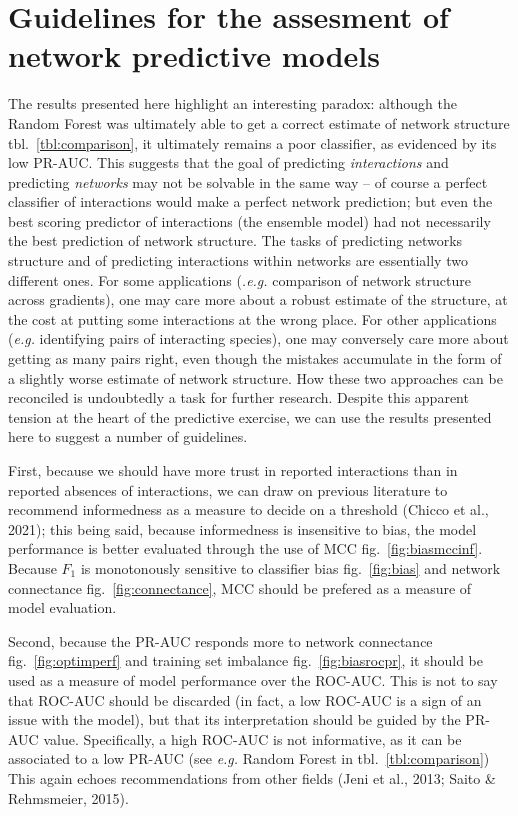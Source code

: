\documentclass[10pt,oneside]{article}
\begin{document}
\hypertarget{guidelines-for-the-assesment-of-network-predictive-models}{%
\section{Guidelines for the assesment of network predictive
models}\label{guidelines-for-the-assesment-of-network-predictive-models}}

The results presented here highlight an interesting paradox: although
the Random Forest was ultimately able to get a correct estimate of
network structure tbl.~\ref{tbl:comparison}, it ultimately remains a
poor classifier, as evidenced by its low PR-AUC. This suggests that the
goal of predicting \emph{interactions} and predicting \emph{networks}
may not be solvable in the same way -- of course a perfect classifier of
interactions would make a perfect network prediction; but even the best
scoring predictor of interactions (the ensemble model) had not
necessarily the best prediction of network structure. The tasks of
predicting networks structure and of predicting interactions within
networks are essentially two different ones. For some applications
(\emph{.e.g.} comparison of network structure across gradients), one may
care more about a robust estimate of the structure, at the cost at
putting some interactions at the wrong place. For other applications
(\emph{e.g.} identifying pairs of interacting species), one may
conversely care more about getting as many pairs right, even though the
mistakes accumulate in the form of a slightly worse estimate of network
structure. How these two approaches can be reconciled is undoubtedly a
task for further research. Despite this apparent tension at the heart of
the predictive exercise, we can use the results presented here to
suggest a number of guidelines.

First, because we should have more trust in reported interactions than
in reported absences of interactions, we can draw on previous literature
to recommend informedness as a measure to decide on a threshold (Chicco
et al., 2021); this being said, because informedness is insensitive to
bias, the model performance is better evaluated through the use of MCC
fig.~\ref{fig:biasmccinf}. Because \(F_1\) is monotonously sensitive to
classifier bias fig.~\ref{fig:bias} and network connectance
fig.~\ref{fig:connectance}, MCC should be prefered as a measure of model
evaluation.

Second, because the PR-AUC responds more to network connectance
fig.~\ref{fig:optimperf} and training set imbalance
fig.~\ref{fig:biasrocpr}, it should be used as a measure of model
performance over the ROC-AUC. This is not to say that ROC-AUC should be
discarded (in fact, a low ROC-AUC is a sign of an issue with the model),
but that its interpretation should be guided by the PR-AUC value.
Specifically, a high ROC-AUC is not informative, as it can be associated
to a low PR-AUC (see \emph{e.g.} Random Forest in
tbl.~\ref{tbl:comparison}) This again echoes recommendations from other
fields (Jeni et al., 2013; Saito \& Rehmsmeier, 2015).
\end{document}
